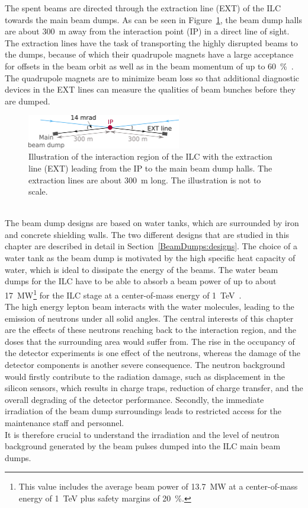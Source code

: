 The spent \positron\electron beams are directed through the extraction line (EXT) of the ILC towards the main beam dumps. 
As can be seen in Figure~\ref{fig:BeamDumps:IP_to_Dump}, the beam dump halls are about \SI{300}{\meter} away from the interaction point (IP) in a direct line of sight.
The extraction lines have the task of transporting the highly disrupted beams to the dumps, because of which their quadrupole magnets have a large acceptance for offsets in the beam orbit as well as in the beam momentum of up to \SI{60}{\percent}~\cite[p. 139]{TDR32}.
The quadrupole magnets are to minimize beam loss so that additional diagnostic devices in the EXT lines can measure the qualities of beam bunches before they are dumped.
\begin{figure}
\centering
\includegraphics[width=0.6\textwidth]{Figures/BeamDump/IP_EXT.png}
\caption[Schematic of the ILC interaction region with extraction line]{Illustration of the interaction region of the ILC with the extraction line (EXT) leading from the IP to the main beam dump halls.
The extraction lines are about \SI[detect-all]{300}{\meter} long.
The illustration is not to scale.}
\label{fig:BeamDumps:IP_to_Dump}
\end{figure}
\\The beam dump designs are based on water tanks, which are surrounded by iron and concrete shielding walls. 
The two different designs that are studied in this chapter are described in detail in Section~\ref{BeamDumps:designs}.
The choice of a water tank as the beam dump is motivated by the high specific heat capacity of water, which is ideal to dissipate the energy of the beams. 
The water beam dumps for the ILC have to be able to absorb a beam power of up to about \SI{17}{\mega\watt}\footnote{This value includes the average beam power of \SI{13.7}{\mega\watt} at a center-of-mass energy of \SI{1}{\TeV} plus safety margins of \SI{20}{\percent}.} for the ILC stage at a center-of-mass energy of \SI{1}{\TeV}~\cite{BeamDumpSpecs}.
\\The high energy lepton beam interacts with the water molecules, leading to the emission of neutrons under all solid angles. 
The central interests of this chapter are the effects of these neutrons reaching back to the interaction region, and the doses that the surrounding area would suffer from. 
The rise in the occupancy of the detector experiments is one effect of the neutrons, whereas the damage of the detector components is another severe consequence.
The neutron background would firstly contribute to the radiation damage, such as displacement in the silicon sensors, which results in charge traps, reduction of charge transfer, and the overall degrading of the detector performance. 
Secondly, the immediate irradiation of the beam dump surroundings leads to restricted access for the maintenance staff and personnel.
\\It is therefore crucial to understand the irradiation and the level of neutron background generated by the beam pulses dumped into the ILC main beam dumps.

